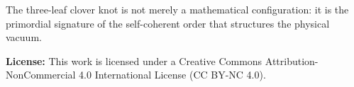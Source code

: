 \documentclass[11pt,a4paper]{article}
\begin{document}
The three-leaf clover knot is not merely a mathematical configuration: it is the primordial signature of the self-coherent order that structures the physical vacuum.

\bigskip

\noindent \textbf{License:} This work is licensed under a Creative Commons Attribution-NonCommercial 4.0 International License (CC BY-NC 4.0).
\end{document}

